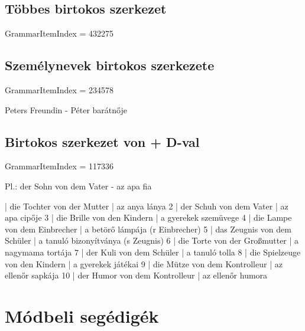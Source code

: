 \documentclass{article}
\newenvironment{desc}{\verbatim}{\endverbatim}
\newenvironment{exmp}{\verbatim}{\endverbatim}
\begin{document}
\subsection{Többes birtokos szerkezet}

GrammarItemIndex = 432275

\begin{desc}
\end{desc}

\begin{exmp}
\end{exmp}

\subsection{Személynevek birtokos szerkezete}

GrammarItemIndex = 234578

\begin{desc}
Peters Freundin - Péter barátnője
\end{desc}

\begin{exmp}
\end{exmp}

\subsection{Birtokos szerkezet von + D-val}

GrammarItemIndex = 117336

\begin{desc}
Pl.: der Sohn von dem Vater - az apa fia
\end{desc}

\begin{exmp}
1 | die Tochter von der Mutter | az anya lánya
2 | der Schuh von dem Vater | az apa cipője
3 | die Brille von den Kindern | a gyerekek szemüvege
4 | die Lampe von dem Einbrecher | a betörő lámpája (r Einbrecher)
5 | das Zeugnis von dem Schüler | a tanuló bizonyítványa (s Zeugnis)
6 | die Torte von der Großmutter | a nagymama tortája
7 | der Kuli von dem Schüler | a tanuló tolla
8 | die Spielzeuge von den Kindern | a gyerekek játékai
9 | die Mütze von dem Kontrolleur | az ellenőr sapkája
10 | der Humor von dem Kontrolleur | az ellenőr humora
\end{exmp}

\section{Módbeli segédigék}
\end{document}
